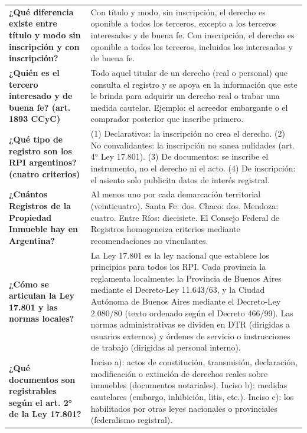 \documentclass[12pt,oneside]{book}
\begin{document}
\begin{longtable}{@{}p{4.3cm}p{9.4cm}@{}}
\textbf{¿Qué diferencia existe entre título y modo sin inscripción y con inscripción?} &
Con título y modo, sin inscripción, el derecho es oponible a todos los terceros, excepto a los terceros interesados y de buena fe. Con inscripción, el derecho es oponible a todos los terceros, incluidos los interesados y de buena fe. \\[0.4em]

\textbf{¿Quién es el tercero interesado y de buena fe? (art. 1893 CCyC)} &
Todo aquel titular de un derecho (real o personal) que consulta el registro y se apoya en la información que este le brinda para adquirir un derecho real o trabar una medida cautelar. Ejemplo: el acreedor embargante o el comprador posterior que inscribe primero. \\[0.4em]

\textbf{¿Qué tipo de registro son los RPI argentinos? (cuatro criterios)} &
(1) Declarativos: la inscripción no crea el derecho. (2) No convalidantes: la inscripción no sanea nulidades (art. 4° Ley 17.801). (3) De documentos: se inscribe el instrumento, no el derecho ni el acto. (4) De inscripción: el asiento solo publicita datos de interés registral. \\[0.4em]

\textbf{¿Cuántos Registros de la Propiedad Inmueble hay en Argentina?} &
Al menos uno por cada demarcación territorial (veinticuatro). Santa Fe: dos. Chaco: dos. Mendoza: cuatro. Entre Ríos: diecisiete. El Consejo Federal de Registros homogeneiza criterios mediante recomendaciones no vinculantes. \\[0.4em]

\textbf{¿Cómo se articulan la Ley 17.801 y las normas locales?} &
La Ley 17.801 es la ley nacional que establece los principios para todos los RPI. Cada provincia la reglamenta localmente: la Provincia de Buenos Aires mediante el Decreto-Ley 11.643/63, y la Ciudad Autónoma de Buenos Aires mediante el Decreto-Ley 2.080/80 (texto ordenado según el Decreto 466/99). Las normas administrativas se dividen en DTR (dirigidas a usuarios externos) y órdenes de servicio o instrucciones de trabajo (dirigidas al personal interno). \\[0.4em]

\textbf{¿Qué documentos son registrables según el art. 2° de la Ley 17.801?} &
Inciso a): actos de constitución, transmisión, declaración, modificación o extinción de derechos reales sobre inmuebles (documentos notariales). Inciso b): medidas cautelares (embargo, inhibición, litis, etc.). Inciso c): los habilitados por otras leyes nacionales o provinciales (federalismo registral). \\[0.4em]


\end{longtable}
\end{document}
